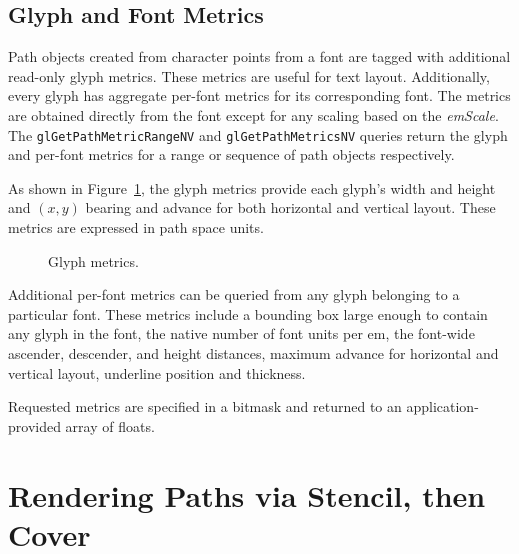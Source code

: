 \subsection{Glyph and Font Metrics}

Path objects created from character points from a font are tagged with
additional read-only glyph metrics.  These metrics are useful for text
layout.  Additionally, every glyph has aggregate per-font metrics for
its corresponding font.  The metrics are obtained directly from the font
except for any scaling based on the {\em emScale}.  The {\tt glGetPathMetricRangeNV}
and {\tt glGetPathMetricsNV} queries return the glyph and per-font metrics for a
range or sequence of path objects respectively.

As shown in Figure~\ref{fig:glyph-metrics}, the glyph metrics provide each
glyph's width and height and $(x,y)$ bearing and advance for both horizontal
and vertical layout.  These metrics are expressed in path space units.
 
\begin{figure}[b]
  \caption{\label{fig:glyph-metrics} Glyph metrics.}
\end{figure}

Additional per-font metrics can be queried from any glyph belonging to a
particular font.  These metrics include a bounding box large enough to
contain any glyph in the font, the native number of font units per em,
the font-wide ascender, descender, and height distances, maximum advance
for horizontal and vertical layout, underline position and thickness.

Requested metrics are specified in a bitmask and returned to an
application-provided array of floats.

\section{Rendering Paths via Stencil, then Cover}

